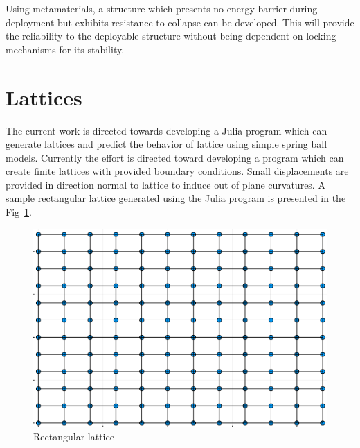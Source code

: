 Using metamaterials, a structure which presents no energy barrier during deployment but exhibits resistance to collapse can be developed. This will provide the reliability to the deployable structure without being dependent on locking mechanisms for its stability.

\section{Lattices}
The current work is directed towards developing a Julia program which can generate lattices and predict the behavior of lattice using simple spring ball models. Currently the effort is directed toward developing a program which can create finite lattices with provided boundary conditions. Small displacements are provided in direction normal to lattice to induce out of plane curvatures. A sample rectangular lattice generated using the Julia program is presented in the Fig~\ref{fig:RectLattice}.
\begin{figure}[htbp]
    \centering
    \includegraphics[width = 1\linewidth]{introduction/fig/lattice.png}
    \caption{Rectangular lattice}
    \label{fig:RectLattice}
\end{figure}{}